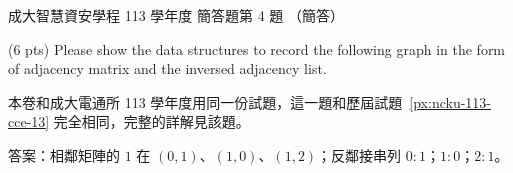 \begin{pastexam}[label={px:ncku-113-isec-13}]{成大智慧資安學程 113 學年度 簡答題第 4 題}
（簡答）

(6 pts) Please show the data structures to record the following graph in the form of adjacency
matrix and the inversed adjacency list.

\begin{center}
\end{center}
\end{pastexam}

\begin{pastsoln}
本卷和成大電通所 113 學年度用同一份試題，這一題和歷屆試題~\ref{px:ncku-113-cce-13} 完全相同，完整的詳解見該題。

答案：相鄰矩陣的 $1$ 在 $(0, 1)$、$(1, 0)$、$(1, 2)$；反鄰接串列 $0\colon 1$；$1\colon 0$；$2\colon 1$。
\end{pastsoln}
